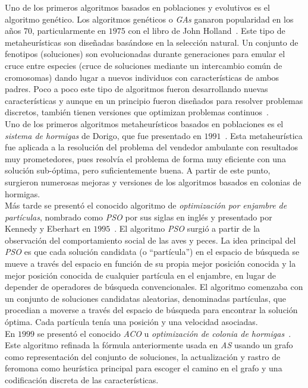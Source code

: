Uno de los primeros algoritmos basados en poblaciones y evolutivos es el algoritmo genético. Los algoritmos genéticos o \textit{GAs} ganaron popularidad en los años $70$, particularmente en $1975$ con el libro de John Holland~\cite{Holland:1975}. Este tipo de metaheurísticas son diseñadas basándose en la selección natural. Un conjunto de fenotipos (soluciones) son evolucionadas durante generaciones para emular el cruce entre especies (cruce de soluciones mediante un intercambio común de cromosomas) dando lugar a nuevos individuos con características de ambos padres. Poco a poco este tipo de algoritmos fueron desarrollando nuevas características y aunque en un principio fueron diseñados para resolver problemas discretos, también tienen versiones que optimizan problemas continuos~\cite{eiben2015}.\\[6pt]
Uno de los primeros algoritmos metaheurísticos basados en poblaciones es el \textit{sistema de hormigas} de Dorigo, que fue presentado en $1991$~\cite{as}. Esta metaheurística fue aplicada a la resolución del problema del vendedor ambulante con resultados muy prometedores, pues resolvía el problema de forma muy eficiente con una solución sub-óptima, pero suficientemente buena. A partir de este punto, surgieron numerosas mejoras y versiones de los algoritmos basados en colonias de hormigas.\\[6pt]
Más tarde se presentó el conocido algoritmo de \textit{optimización por enjambre de partículas}, nombrado como \textit{PSO} por sus siglas en inglés y presentado por Kennedy y Eberhart en $1995$~\cite{kennedy_particle_1995}. El algoritmo \textit{PSO} surgió a partir de la observación del comportamiento social de las aves y peces. La idea principal del \textit{PSO} es que cada solución candidata (o ``partícula'') en el espacio de búsqueda se mueve a través del espacio en función de su propia mejor posición conocida y la mejor posición conocida de cualquier partícula en el enjambre, en lugar de depender de operadores de búsqueda convencionales. El algoritmo comenzaba con un conjunto de soluciones candidatas aleatorias, denominadas partículas, que procedian a moverse a través del espacio de búsqueda para encontrar la solución óptima. Cada partícula tenía una posición y una velocidad asociadas.\\[6pt] 
En $1999$ se presentó el conocido \textit{ACO} u \textit{optimización de colonia de hormigas}~\cite{dorigo_ant_1999}. Este algoritmo refinada la fórmula anteriormente usada en \textit{AS} usando un grafo como representación del conjunto de soluciones, la actualización y rastro de feromona como heurística principal para escoger el camino en el grafo y una codificación discreta de las características.\\[6pt]
